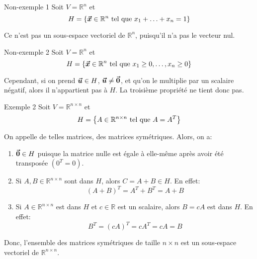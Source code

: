 \documentclass[a4paper]{article}
\begin{document}
\begin{parag}{Non-exemple 1}
    Soit $V = \mathbb{R}^{n}$ et
    \[H = \left\{\bvec{x} \in \mathbb{R}^{n} \telque x_1 + \ldots + x_n = 1\right\}\]

    Ce n'est pas un sous-espace vectoriel de $\mathbb{R}^{n}$, puisqu'il n'a pas le vecteur nul.
\end{parag}

\begin{parag}{Non-exemple 2}
    Soit $V = \mathbb{R}^{n}$ et
    \[H = \left\{\bvec{x} \in \mathbb{R}^{n} \telque x_1 \geq 0, \ldots, x_n \geq 0\right\}\]

    Cependant, si on prend $\bm{\protect\vec{u}} \in H$, $\bm{\protect\vec{u}} \neq \bm{\protect\vec{0}}$, et qu'on le multiplie par un scalaire négatif, alors il n'appartient pas à $H$. La troisième propriété ne tient donc pas.
\end{parag}

\begin{parag}{Exemple 2}
    Soit $V = \mathbb{R}^{n \times n}$ et
    \[H = \left\{A \in \mathbb{R}^{n \times n} \telque A = A^{T}\right\}\]

    On appelle de telles matrices, des matrices symétriques. Alors, on a:
    \begin{enumerate}
        \item $\bm{\protect\vec{0}} \in H$ puisque la matrice nulle est égale à elle-même après avoir été transposée $(0^T = 0)$.
        \item Si $A,B \in \mathbb{R}^{n\times n}$ sont dans $H$, alors $C = A+B \in H$. En effet:
            \[\left(A + B\right)^{T} = A^{T} + B^{T} = A + B\]

        \item Si $A \in \mathbb{R}^{n\times n}$ est dans $H$ et $c \in \mathbb{R}$ est un scalaire, alors $B = cA$ est dans $H$. En effet:
            \[B^{T} = \left(cA\right)^{T} = cA^{T} = cA = B\]

    \end{enumerate}

    Donc, l'ensemble des matrices symétriques de taille $n \times n$ est un sous-espace vectoriel de $\mathbb{R}^{n\times n}$.
\end{parag}
\end{document}
